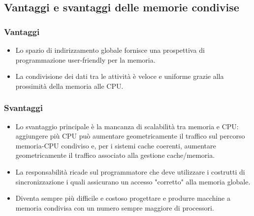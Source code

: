 \subsection{Vantaggi e svantaggi delle memorie condivise}
\subsubsection*{Vantaggi}
\begin{itemize}
	\item Lo spazio di indirizzamento globale fornisce una prospettiva di programmazione user-friendly
	per la memoria.
	\item La condivisione dei dati tra le attività è veloce e uniforme grazie alla
	prossimità della memoria alle CPU.
\end{itemize}
\subsubsection*{Svantaggi}
\begin{itemize}
	\item Lo svantaggio principale è la mancanza di scalabilità tra memoria e
	CPU: aggiungere più CPU può aumentare geometricamente il traffico sul percorso memoria-CPU condiviso e, per i sistemi cache coerenti, aumentare geometricamente il traffico associato alla gestione cache/memoria.
	\item  La responsabilità ricade sul programmatore che deve utilizzare i costrutti di sincronizzazione i quali assicurano
	un accesso "corretto" alla memoria globale.
	\item  Diventa sempre più difficile e costoso progettare e
	produrre macchine a memoria condivisa con un numero sempre maggiore di
	processori.
\end{itemize}
\clearpage
